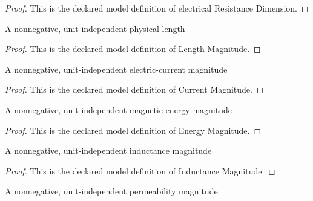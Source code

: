 \begin{proof}
  This is the declared model definition of electrical Resistance Dimension.
\end{proof}
\begin{definition}
  \label{def:physics:phyx-mini-0990:phyxminiproblems-problemphyxmini0990-lengthmagnitude}
  A nonnegative, unit-independent physical length
\end{definition}
\begin{proof}
  This is the declared model definition of Length Magnitude.
\end{proof}
\begin{definition}
  \label{def:physics:phyx-mini-0990:phyxminiproblems-problemphyxmini0990-currentmagnitude}
  A nonnegative, unit-independent electric-current magnitude
\end{definition}
\begin{proof}
  This is the declared model definition of Current Magnitude.
\end{proof}
\begin{definition}
  \label{def:physics:phyx-mini-0990:phyxminiproblems-problemphyxmini0990-energymagnitude}
  A nonnegative, unit-independent magnetic-energy magnitude
\end{definition}
\begin{proof}
  This is the declared model definition of Energy Magnitude.
\end{proof}
\begin{definition}
  \label{def:physics:phyx-mini-0990:phyxminiproblems-problemphyxmini0990-inductancemagnitude}
  A nonnegative, unit-independent inductance magnitude
\end{definition}
\begin{proof}
  This is the declared model definition of Inductance Magnitude.
\end{proof}
\begin{definition}
  \label{def:physics:phyx-mini-0990:phyxminiproblems-problemphyxmini0990-magneticpermeabilitymagnitude}
  A nonnegative, unit-independent permeability magnitude
\end{definition}
